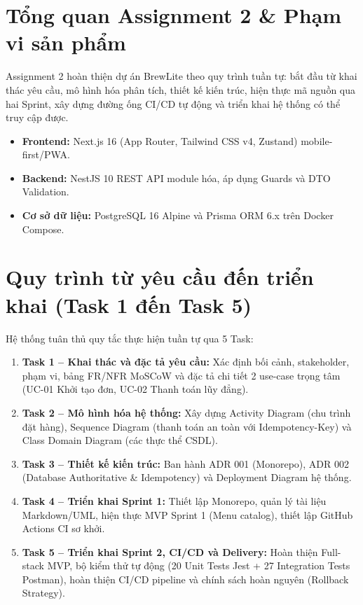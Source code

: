 \documentclass[a4paper]{article}
\begin{document}
\thispagestyle{empty}
\newpage
\tableofcontents
\newpage

\section{Tổng quan Assignment 2 \& Phạm vi sản phẩm}
Assignment 2 hoàn thiện dự án BrewLite theo quy trình tuần tự: bắt đầu từ khai thác yêu cầu, mô hình hóa phân tích, thiết kế kiến trúc, hiện thực mã nguồn qua hai Sprint, xây dựng đường ống CI/CD tự động và triển khai hệ thống có thể truy cập được.
\begin{itemize}
    \item \textbf{Frontend:} Next.js 16 (App Router, Tailwind CSS v4, Zustand) mobile-first/PWA.
    \item \textbf{Backend:} NestJS 10 REST API module hóa, áp dụng Guards và DTO Validation.
    \item \textbf{Cơ sở dữ liệu:} PostgreSQL 16 Alpine và Prisma ORM 6.x trên Docker Compose.
\end{itemize}

\section{Quy trình từ yêu cầu đến triển khai (Task 1 đến Task 5)}
Hệ thống tuân thủ quy tắc thực hiện tuần tự qua 5 Task:
\begin{enumerate}
    \item \textbf{Task 1 – Khai thác và đặc tả yêu cầu:} Xác định bối cảnh, stakeholder, phạm vi, bảng FR/NFR MoSCoW và đặc tả chi tiết 2 use-case trọng tâm (UC-01 Khởi tạo đơn, UC-02 Thanh toán lũy đẳng).
    \item \textbf{Task 2 – Mô hình hóa hệ thống:} Xây dựng Activity Diagram (chu trình đặt hàng), Sequence Diagram (thanh toán an toàn với Idempotency-Key) và Class Domain Diagram (các thực thể CSDL).
    \item \textbf{Task 3 – Thiết kế kiến trúc:} Ban hành ADR 001 (Monorepo), ADR 002 (Database Authoritative \& Idempotency) và Deployment Diagram hệ thống.
    \item \textbf{Task 4 – Triển khai Sprint 1:} Thiết lập Monorepo, quản lý tài liệu Markdown/UML, hiện thực MVP Sprint 1 (Menu catalog), thiết lập GitHub Actions CI sơ khởi.
    \item \textbf{Task 5 – Triển khai Sprint 2, CI/CD và Delivery:} Hoàn thiện Full-stack MVP, bộ kiểm thử tự động (20 Unit Tests Jest + 27 Integration Tests Postman), hoàn thiện CI/CD pipeline và chính sách hoàn nguyên (Rollback Strategy).
\end{enumerate}
\end{document}
